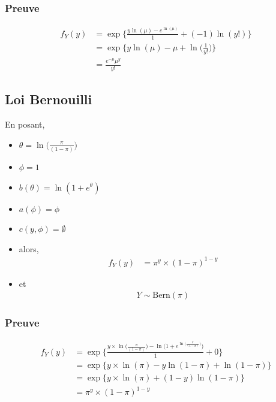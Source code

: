 \documentclass[11pt,french]{report}
\newcommand{\fact}[1]{#1\mathpunct{}!}
\begin{document}
\subsubsection*{Preuve}
\begin{align*}
f_Y(y) &= \exp\Bigg\lbrace \frac{y \ln(\mu) - e^{\ln(\mu)}}{1} + (-1) \ln(\fact{y}) \Bigg\rbrace \\
&= \exp\Bigg\lbrace y \ln(\mu) - \mu + \ln\bigg(\frac{1}{\fact{y}}\bigg) \Bigg\rbrace \\
&= \frac{e^{-\mu}\mu^y}{\fact{y}}
\end{align*}

\subsection{Loi Bernouilli}
En posant,
\begin{itemize}
     \item $\theta = \ln\Big(\frac{\pi}{(1 -\pi)}\Big)$
     \item $\phi = 1$
     \item $b(\theta) = \ln(1 + e^{\theta})$
     \item $a(\phi) = \phi$
     \item $c(y, \phi) = \emptyset$
     \item[] alors,
     \begin{align*}
          f_Y(y) &= \pi^y \times (1 - \pi)^{1 - y}
     \end{align*}
     \item[] et
     \begin{align*}
          Y \sim \text{Bern}(\pi)
     \end{align*}
\end{itemize}

\subsubsection*{Preuve}
\begin{align*}
f_Y(y) &= \exp\Bigg\lbrace \frac{y \times \ln\big(\frac{\pi}{(1 -\pi)}\big) - \ln\bigg( 1 + e^{\ln\big(\frac{\pi}{(1 -\pi)}\big)}\bigg)}{1} + 0 \Bigg\rbrace \\
&= \exp\Bigg\lbrace y \times \ln(\pi) - y \ln(1 -\pi) + \ln( 1 -\pi) \Bigg\rbrace \\
&= \exp\Bigg\lbrace y \times \ln(\pi) + (1 - y) \ln(1 -\pi) \Bigg\rbrace \\
&= \pi^y \times (1 - \pi)^{1 - y}
\end{align*}
\end{document}
